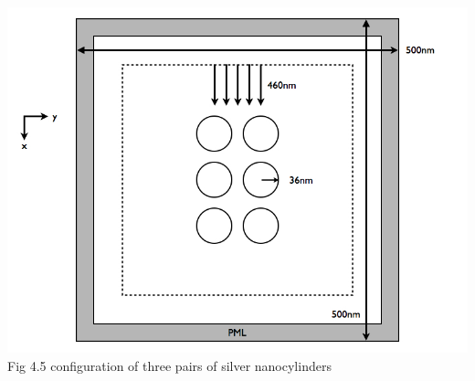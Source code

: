 \documentclass[openany]{book}
\begin{document}
\begin{center}
\includegraphics[scale=0.5]{images/open-cavity-config.jpg}\\
Fig 4.5
configuration of three pairs of silver nanocylinders
\end{center}
\end{document}
